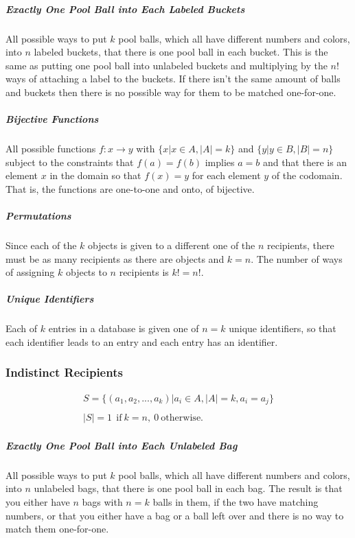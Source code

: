 \subparagraph{Exactly One Pool Ball into Each Labeled Buckets} All possible ways to put $k$ pool balls, which all have different numbers and colors, into $n$ labeled buckets, that there is one pool ball in each bucket. This is the same as putting one pool ball into unlabeled buckets and multiplying by the $n!$ ways of attaching a label to the buckets. If there isn't the same amount of balls and buckets then there is no possible way for them to be matched one-for-one.

\subparagraph{Bijective Functions} All possible functions $f:x \rightarrow y$ with $\{x | x\in A, |A| = k \}$ and $\{y | y\in B, |B| = n\}$ subject to the constraints that $f(a) = f(b)$ implies $a=b$ and that there is an element $x$ in the domain so that $f(x)=y$ for each element $y$ of the codomain. That is, the functions are one-to-one and onto, of bijective.

\subparagraph{Permutations} Since each of the $k$ objects is given to a different one of the $n$ recipients, there must be as many recipients as there are objects and $k=n$. The number of ways of assigning $k$ objects to $n$ recipients is $k!=n!$.

\subparagraph{Unique Identifiers} Each of $k$ entries in a database is given one of $n=k$ unique identifiers, so that each identifier leads to an entry and each entry has an identifier. 

\subsubsection{Indistinct Recipients}

\begin{equation}	
\begin{array}{l}
S = \{ (a_1,a_2,...,a_k) | a_i \in A, |A| = k, a_i=a_j\}\\
\\
|S| = 1\ \ \mathrm{if\ }k = n,\ 0\ \mathrm{otherwise.}
\end{array}
\end{equation}


\subparagraph{Exactly One Pool Ball into Each Unlabeled Bag} All possible ways to put $k$ pool balls, which all have different numbers and colors, into $n$ unlabeled bags, that there is one pool ball in each bag. The result is that you either have $n$ bags with $n=k$ balls in them, if the two have matching numbers, or that you either have a bag or a ball left over and there is no way to match them one-for-one.

